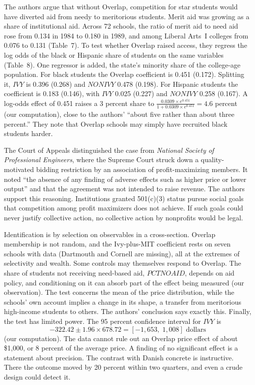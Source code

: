 The authors argue that without Overlap, competition for star students would have diverted aid from needy to
meritorious students. Merit aid was growing as a share of institutional aid. Across 72 schools, the ratio of merit
aid to need aid rose from 0.134 in 1984 to 0.180 in 1989, and among Liberal Arts~I colleges from 0.076 to 0.131
(Table~7). To test whether Overlap raised access, they regress the log odds of the black or Hispanic share of
students on the same variables (Table~8). One regressor is added, the state's minority share of the college-age
population. For black
students the Overlap coefficient is 0.451 (0.172). Splitting it, $\mathit{IVY}$ is 0.396 (0.268) and
$\mathit{NONIVY}$ 0.478 (0.198). For Hispanic students the coefficient is 0.183 (0.146), with $\mathit{IVY}$ 0.025
(0.227) and $\mathit{NONIVY}$ 0.258 (0.167). A log-odds effect of 0.451 raises a 3 percent share to
$\frac{0.0309 \times e^{0.451}}{1 + 0.0309 \times e^{0.451}} = 4.6$ percent (our computation), close to the
authors' ``about five rather than about three percent.'' They note that Overlap schools may simply have recruited
black students harder.

The Court of Appeals distinguished the case from \textit{National Society of Professional Engineers},
where the Supreme Court struck down a quality-motivated bidding restriction by an association of profit-maximizing
members. It noted ``the absence of any finding of adverse effects such as higher price or lower output'' and that
the agreement was not intended to raise revenue. The authors support this reasoning. Institutions granted
501(c)(3) status pursue social goals that competition among profit maximizers does not achieve. If such goals
could never justify collective action, no collective action by nonprofits would be legal.

Identification is by selection on observables in a cross-section. Overlap membership is not random, and
the Ivy-plus-MIT coefficient rests on seven schools with data (Dartmouth and Cornell are missing), all at the
extremes of selectivity and wealth. Some controls may themselves respond to Overlap. The share of students not
receiving need-based aid, $\mathit{PCTNOAID}$, depends on aid policy, and conditioning on it can absorb part of the
effect being measured (our observation). The test concerns the mean of the price distribution, while the
schools' own account implies a change in its shape, a transfer from meritorious high-income students to others.
The authors' conclusion says exactly this. Finally, the test has limited power. The 95 percent confidence interval
for $\mathit{IVY}$ is
\begin{equation*}
  -322.42 \pm 1.96 \times 678.72 = [-1{,}653,\; 1{,}008] \text{ dollars}
\end{equation*}
(our computation). The data cannot rule out an Overlap price effect of about \$1,000, or 8 percent of the average
price. A finding of no significant effect is a statement about precision. The contrast with Danish concrete is
instructive. There the outcome moved by 20 percent within two quarters, and even a crude design could detect it.

